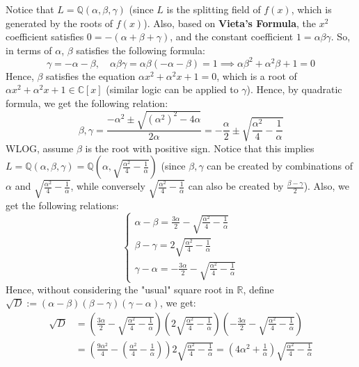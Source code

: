 \documentclass{article}
\newcommand{\QQ}{\mathbb{Q}}
\newcommand{\RR}{\mathbb{R}}
\newcommand{\CC}{\mathbb{C}}
\begin{document}
Notice that $L=\QQ(\alpha,\beta,\gamma)$ (since $L$ is the splitting field of $f(x)$, which is generated by the roots of $f(x)$). Also, based on \textbf{Vieta's Formula}, the $x^2$ coefficient satisfies $0 = -(\alpha+\beta+\gamma)$, and the constant coefficient $1=\alpha\beta\gamma$. So, in terms of $\alpha$, $\beta$ satisfies the following formula:
\begin{equation}
    \label{eq:1}
    \gamma = -\alpha-\beta,\quad \alpha\beta\gamma = \alpha\beta(-\alpha-\beta)=1 \implies \alpha \beta^2 + \alpha^2\beta + 1 = 0
\end{equation}
Hence, $\beta$ satisfies the equation $\alpha x^2+\alpha^2x +1=0$, which is a root of $\alpha x^2+\alpha^2x+1\in \CC[x]$ (similar logic can be applied to $\gamma$). Hence, by quadratic formula, we get the following relation:
\begin{equation}
    \label{eq:2}
    \beta,\gamma = \frac{-\alpha^2\pm \sqrt{(\alpha^2)^2-4\alpha}}{2\alpha} = -\frac{\alpha}{2}\pm \sqrt{\frac{\alpha^2}{4}-\frac{1}{\alpha}}
\end{equation} 
WLOG, assume $\beta$ is the root with positive sign. Notice that this implies $L=\QQ\left(\alpha,\beta,\gamma\right) = \QQ\left(\alpha,\sqrt{\frac{\alpha^2}{4}-\frac{1}{\alpha}}\right)$ (since $\beta,\gamma$ can be created by combinations of $\alpha$ and $\sqrt{\frac{\alpha^2}{4}-\frac{1}{\alpha}}$, while conversely $\sqrt{\frac{\alpha^2}{4}-\frac{1}{\alpha}}$ can also be created by $\frac{\beta-\gamma}{2}$). Also, we get the following relations:
\begin{equation}
    \label{eq:3}
    \begin{cases}
        \alpha-\beta = \frac{3\alpha}{2} - \sqrt{\frac{\alpha^2}{4}-\frac{1}{\alpha}}\\
        \beta-\gamma = 2\sqrt{\frac{\alpha^2}{4}-\frac{1}{\alpha}}\\
        \gamma-\alpha = -\frac{3\alpha}{2}-\sqrt{\frac{\alpha^2}{4}-\frac{1}{\alpha}}
    \end{cases}
\end{equation}
Hence, without considering the "usual" square root in $\RR$, define $\sqrt{D}:=(\alpha-\beta)(\beta-\gamma)(\gamma-\alpha)$, we get:
\begin{equation}
    \label{eq:4}
    \begin{split}
        \sqrt{D} &= \left(\frac{3\alpha}{2} - \sqrt{\frac{\alpha^2}{4}-\frac{1}{\alpha}}\right)\left(2\sqrt{\frac{\alpha^2}{4}-\frac{1}{\alpha}}\right)\left(-\frac{3\alpha}{2}-\sqrt{\frac{\alpha^2}{4}-\frac{1}{\alpha}}\right)\\
        &= \left(\frac{9\alpha^2}{4}-\left(\frac{\alpha^2}{4}-\frac{1}{\alpha}\right)\right)2\sqrt{\frac{\alpha^2}{4}-\frac{1}{\alpha}} = \left(4\alpha^2+\frac{1}{\alpha}\right)\sqrt{\frac{\alpha^2}{4}-\frac{1}{\alpha}}
    \end{split}
\end{equation}
\end{document}

